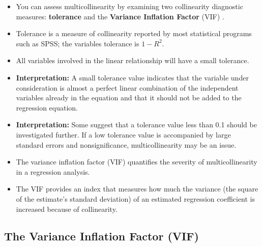 \documentclass[a4paper,12pt]{article}
\begin{document}
\begin{itemize}
	\item You can assess multicollinearity by examining two collinearity diagnostic  measures: \textbf{tolerance} and the \textbf{Variance Inflation Factor} (VIF) .
	\item Tolerance is a measure of collinearity reported by most statistical programs such as SPSS; the variables tolerance is $1-R^2$. 

	\item All variables involved in the linear relationship will have a small tolerance. 
	\item \textbf{Interpretation:} A small tolerance value indicates that the variable under consideration is almost a perfect linear combination of the independent variables already in the equation and that it should not be added to the regression equation. 
	\item \textbf{Interpretation:} Some suggest that a tolerance value less than 0.1 should be investigated further. If a low tolerance value is accompanied by large standard errors and nonsignificance, multicollinearity may be an issue.
		
		\item The variance inflation factor (VIF) quantifies the severity of multicollinearity in a regression analysis.
		
		\item The VIF provides an index that measures how much the variance (the square of the estimate's standard deviation) of an estimated regression coefficient is increased because of collinearity.
		
\end{itemize}	
		
		
	
\subsection{The Variance Inflation Factor (VIF)}
\end{document}
